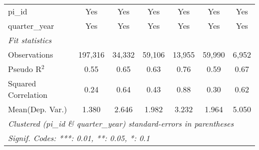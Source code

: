 \begin{tabular}{lcccccc}
   pi\_id                                                     & Yes            & Yes           & Yes           & Yes           & Yes           & Yes\\  
   quarter\_year                                              & Yes            & Yes           & Yes           & Yes           & Yes           & Yes\\  
   \midrule
   \emph{Fit statistics}\\
   Observations                                               & 197,316        & 34,332        & 59,106        & 13,955        & 59,990        & 6,952\\  
   Pseudo R$^2$                                               & 0.55           & 0.65          & 0.63          & 0.76          & 0.59          & 0.67\\  
   Squared Correlation                                        & 0.24           & 0.64          & 0.43          & 0.88          & 0.30          & 0.62\\  
Mean(Dep. Var.) & 1.380 & 2.646 & 1.982 & 3.232 & 1.964 & 5.050 \\
   \midrule \midrule
   \multicolumn{7}{l}{\emph{Clustered (pi\_id \& quarter\_year) standard-errors in parentheses}}\\
   \multicolumn{7}{l}{\emph{Signif. Codes: ***: 0.01, **: 0.05, *: 0.1}}\\
\end{tabular}
\par\endgroup
